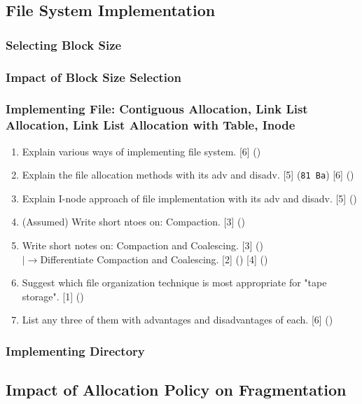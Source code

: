 \documentclass[12pt]{article}
\newcommand{\lb}{\\$\left|\rightarrow\right.$}
\begin{document}
	\subsection{File System Implementation}
		\subsubsection{Selecting Block Size}
		\subsubsection{Impact of Block Size Selection}
		\subsubsection{Implementing File: Contiguous Allocation, Link List Allocation, Link List Allocation with Table, Inode}
			\begin{enumerate}
				\item Explain various ways of implementing file system. \hfill [6] ()

				\item Explain the file allocation methods with its adv and disadv. \hfill [5] (\texttt{81 Ba}) [6] ()

				\item Explain I-node approach of file implementation with its adv and disadv. \hfill [5] ()

				\item (Assumed) Write short ntoes on: Compaction. \hfill [3] ()
				
				\item Write short notes on: Compaction and Coalescing. \hfill [3] ()
				\lb Differentiate Compaction and Coalescing. \hfill [2] () [4] ()

				\item Suggest which file organization technique is most appropriate for "tape storage". \hfill [1] ()

				\item List any three of them with advantages and disadvantages of each. \hfill [6] ()
			\end{enumerate}

		\subsubsection{Implementing Directory}
	\subsection{Impact of Allocation Policy on Fragmentation}
\end{document}
